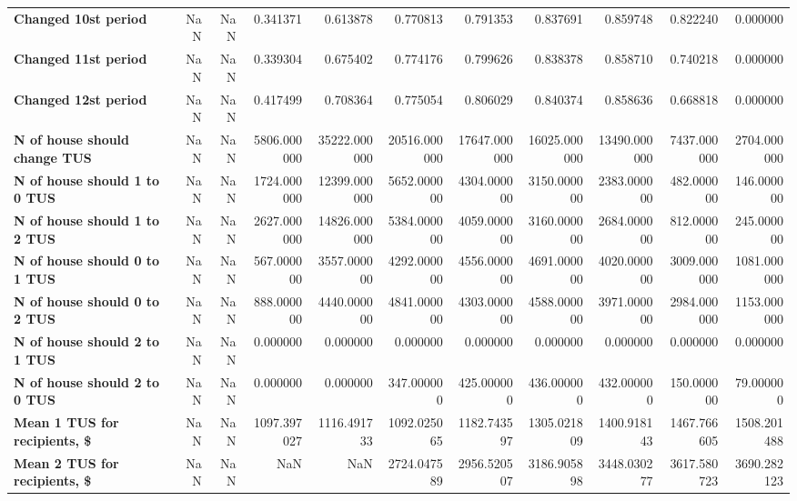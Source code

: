\begin{longtable}{lrrrrrrrrrr}
\textbf{Changed 10st period               } &   NaN &   NaN &     0.341371 &      0.613878 &      0.770813 &      0.791353 &      0.837691 &      0.859748 &     0.822240 &     0.000000 \\
\textbf{Changed 11st period               } &   NaN &   NaN &     0.339304 &      0.675402 &      0.774176 &      0.799626 &      0.838378 &      0.858710 &     0.740218 &     0.000000 \\
\textbf{Changed 12st period               } &   NaN &   NaN &     0.417499 &      0.708364 &      0.775054 &      0.806029 &      0.840374 &      0.858636 &     0.668818 &     0.000000 \\
\textbf{N of house should change TUS      } &   NaN &   NaN &  5806.000000 &  35222.000000 &  20516.000000 &  17647.000000 &  16025.000000 &  13490.000000 &  7437.000000 &  2704.000000 \\
\textbf{N of house should 1 to 0 TUS      } &   NaN &   NaN &  1724.000000 &  12399.000000 &   5652.000000 &   4304.000000 &   3150.000000 &   2383.000000 &   482.000000 &   146.000000 \\
\textbf{N of house should 1 to 2 TUS      } &   NaN &   NaN &  2627.000000 &  14826.000000 &   5384.000000 &   4059.000000 &   3160.000000 &   2684.000000 &   812.000000 &   245.000000 \\
\textbf{N of house should 0 to 1 TUS      } &   NaN &   NaN &   567.000000 &   3557.000000 &   4292.000000 &   4556.000000 &   4691.000000 &   4020.000000 &  3009.000000 &  1081.000000 \\
\textbf{N of house should 0 to 2 TUS      } &   NaN &   NaN &   888.000000 &   4440.000000 &   4841.000000 &   4303.000000 &   4588.000000 &   3971.000000 &  2984.000000 &  1153.000000 \\
\textbf{N of house should 2 to 1 TUS      } &   NaN &   NaN &     0.000000 &      0.000000 &      0.000000 &      0.000000 &      0.000000 &      0.000000 &     0.000000 &     0.000000 \\
\textbf{N of house should 2 to 0 TUS      } &   NaN &   NaN &     0.000000 &      0.000000 &    347.000000 &    425.000000 &    436.000000 &    432.000000 &   150.000000 &    79.000000 \\
\textbf{Mean 1 TUS for recipients, \$      } &   NaN &   NaN &  1097.397027 &   1116.491733 &   1092.025065 &   1182.743597 &   1305.021809 &   1400.918143 &  1467.766605 &  1508.201488 \\
\textbf{Mean 2 TUS for recipients, \$      } &   NaN &   NaN &          NaN &           NaN &   2724.047589 &   2956.520507 &   3186.905898 &   3448.030277 &  3617.580723 &  3690.282123 \\

\end{longtable}
